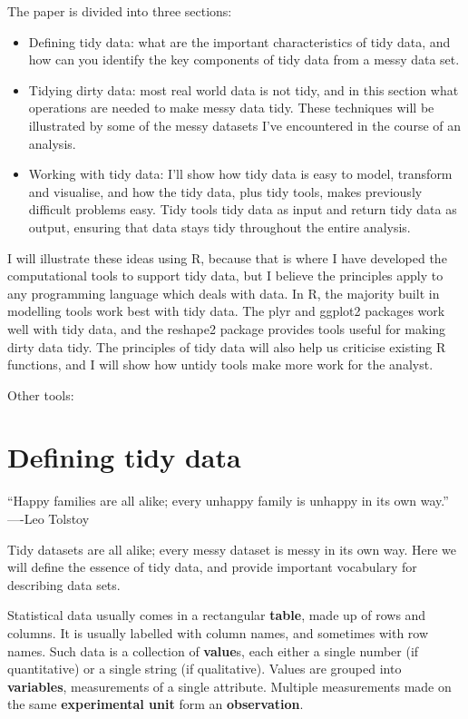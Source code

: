 \documentclass[oneside]{article}
\begin{document}
The paper is divided into three sections:

\begin{itemize}

\item Defining tidy data: what are the important characteristics of tidy data, and how can you identify the key components of tidy data from a messy data set.

\item Tidying dirty data: most real world data is not tidy, and in this section what operations are needed to make messy data tidy. These techniques will be illustrated by some of the messy datasets I've encountered in the course of an analysis.

\item Working with tidy data: I'll show how tidy data is easy to model, transform and visualise, and how the tidy data, plus tidy tools, makes previously difficult problems easy. Tidy tools tidy data as input and return tidy data as output, ensuring that data stays tidy throughout the entire analysis.

\end{itemize}

I will illustrate these ideas using R, because that is where I have developed the computational tools to support tidy data, but I believe the principles apply to any programming language which deals with data. In R, the majority built in modelling tools work best with tidy data. The plyr and ggplot2 \citep{me:ggplot2} packages work well with tidy data, and the reshape2 package provides tools useful for making dirty data tidy. The principles of tidy data will also help us criticise existing R functions, and I will show how untidy tools make more work for the analyst.

Other tools: \citep{kandel:2011}

\section{Defining tidy data}

``Happy families are all alike; every unhappy family is unhappy in its own way.'' ----Leo Tolstoy

Tidy datasets are all alike; every messy dataset is messy in its own way. Here we will define the essence of tidy data, and provide important vocabulary for describing data sets.

Statistical data usually comes in a rectangular \textbf{table}, made up of rows and columns. It is usually labelled with column names, and sometimes with row names. Such data is a collection of \textbf{value}s, each either a single number (if quantitative) or a single string (if qualitative). Values are grouped into \textbf{variables}, measurements of a single attribute. Multiple measurements made on the same \textbf{experimental unit} form an \textbf{observation}. 
\end{document}
